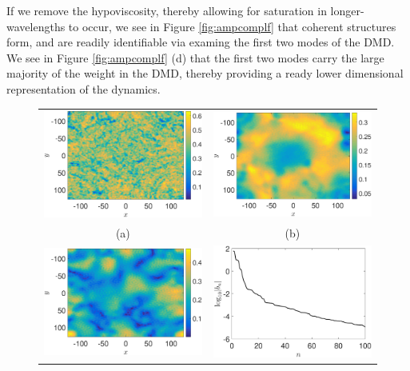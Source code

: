 \documentclass[a4paper,11pt]{article}
\begin{document}
If we remove the hypoviscosity, thereby allowing for saturation in longer-wavelengths to occur, we see in Figure \ref{fig:ampcomplf} that coherent structures form, and are readily identifiable via examing the first two modes of the DMD.  We see in Figure \ref{fig:ampcomplf} (d) that the first two modes carry the large majority of the weight in the DMD, thereby providing a ready lower dimensional representation of the dynamics.  
\begin{figure}
\centering
\begin{tabular}{cc}
\includegraphics[width=.52\textwidth]{amplitude_K_128_Lx_128_tf_1pt5e4} &\hspace{-24pt} \includegraphics[width=.52\textwidth]{dmd1_amplitude_K_128_Lx_128_tf_1pt5e4}\\
(a) & (b)\\
\includegraphics[width=.52\textwidth]{dmd2_amplitude_K_128_Lx_128_tf_1pt5e4} &\hspace{-24pt} \includegraphics[width=.52\textwidth]{dmd_mags_K_128_Lx_128_tf_1pt5e4}\\

\end{tabular}
\end{figure}
\end{document}
